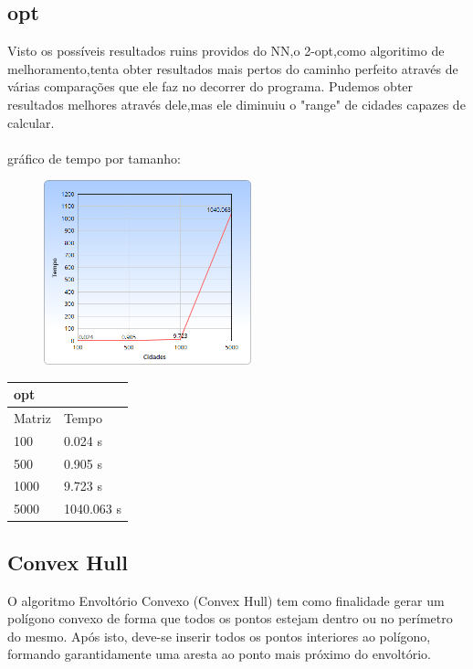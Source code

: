 \documentclass[a4paper,10pt]{article}
\begin{document}
   \subsection{opt}
	Visto os possíveis resultados ruins providos do NN,o 2-opt,como algoritimo de melhoramento,tenta obter resultados mais pertos do caminho perfeito através de várias comparações que ele faz no decorrer do programa.
	Pudemos obter resultados melhores através dele,mas ele diminuiu o "range" de cidades capazes de calcular.
     \\\\gráfico de tempo por tamanho: 
   
   \begin{figure}[!htb]
   \includegraphics[width=6cm]{opt.png}
   \end{figure} 
\begin{table}[ht]
\centering
\label{opt}
\begin{tabular}{|ll|}
\hline
opt                        &          \\ \hline
\multicolumn{1}{|l|}{Matriz} & Tempo    \\ \hline
\multicolumn{1}{|l|}{100}    & 0.024 s  \\ \hline
\multicolumn{1}{|l|}{500}   & 0.905 s  \\ \hline
\multicolumn{1}{|l|}{1000}   & 9.723 s  \\ \hline
\multicolumn{1}{|l|}{5000}  & 1040.063 s \\ \hline
\end{tabular}
\end{table}
   \subsection{Convex Hull}
   O algoritmo Envoltório Convexo (Convex Hull) tem como finalidade gerar um polígono convexo de forma que todos os pontos estejam dentro ou no perímetro do mesmo. Após isto, deve-se inserir todos os pontos interiores ao polígono, formando garantidamente uma aresta ao ponto mais próximo do envoltório.
 
\end{document}

